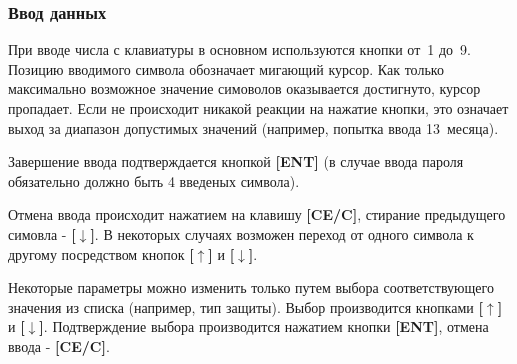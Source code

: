 \subsubsection{Ввод данных} \label{sssec:keyboard_enter}

При вводе числа с клавиатуры в основном используются кнопки от~1 до~9. Позицию вводимого символа обозначает мигающий курсор. Как только максимально возможное значение симоволов оказывается достигнуто, курсор пропадает. Если не происходит никакой реакции на нажатие кнопки, это означает выход за диапазон допустимых значений (например, попытка ввода 13~месяца).

Завершение ввода подтверждается кнопкой \textbf{[ENT]} (в случае ввода пароля обязательно должно быть 4 введеных символа).

Отмена ввода происходит нажатием на клавишу \textbf{[CE/C]}, стирание предыдущего симовла - \textbf{[$\downarrow$]}. В некоторых случаях возможен переход от одного символа к другому посредством кнопок \textbf{[$\uparrow$]} и \textbf{[$\downarrow$]}.

Некоторые параметры можно изменить только путем выбора соответствующего значения из списка (например, тип защиты). Выбор производится кнопками \textbf{[$\uparrow$]} и \textbf{[$\downarrow$]}. Подтверждение выбора производится нажатием кнопки \textbf{[ENT]}, отмена ввода - \textbf{[CE/C]}.